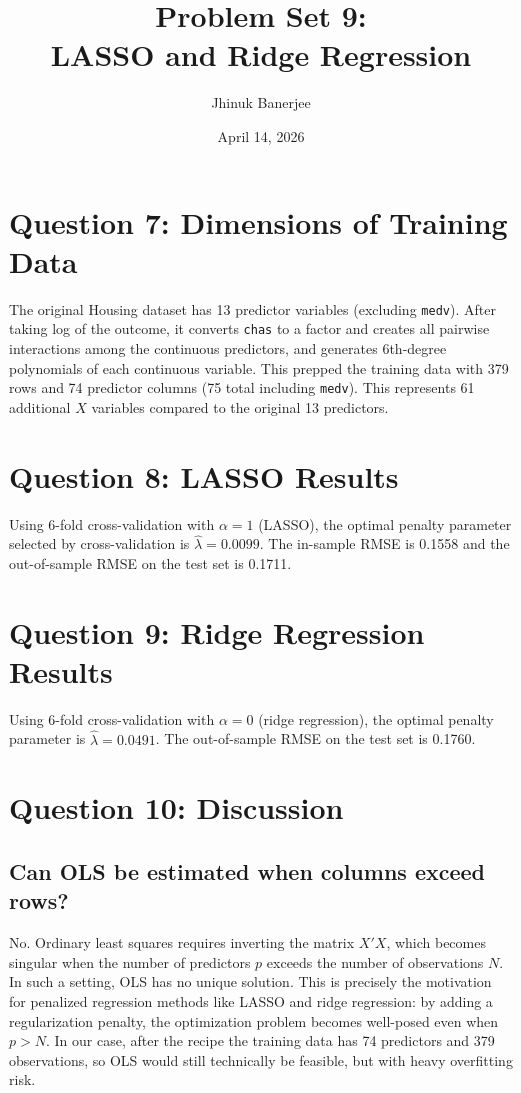 \documentclass[12pt]{article}
\title{\textbf{Problem Set 9:} \\
LASSO and Ridge Regression}
\author{Jhinuk Banerjee}
\date{April 14, 2026}
\begin{document}
\maketitle

\section*{Question 7: Dimensions of Training Data}

The original Housing dataset has 13 predictor variables (excluding \texttt{medv}).
After taking log of the outcome, it converts \texttt{chas} to a
factor and creates all pairwise interactions among the continuous predictors, and generates
6th-degree polynomials of each continuous variable. This prepped the training data with
379 rows and 74 predictor columns (75 total including \texttt{medv}).
This represents 61 additional $X$ variables compared to the original 13 predictors.

\section*{Question 8: LASSO Results}

Using 6-fold cross-validation with $\alpha = 1$ (LASSO), the optimal penalty
parameter selected by cross-validation is $\hat{\lambda} = 0.0099$.
The in-sample RMSE is 0.1558 and the out-of-sample RMSE on the test set
is 0.1711.

\section*{Question 9: Ridge Regression Results}

Using 6-fold cross-validation with $\alpha = 0$ (ridge regression), the optimal
penalty parameter is $\hat{\lambda} = 0.0491$.
The out-of-sample RMSE on the test set is 0.1760.

\section*{Question 10: Discussion}

\subsection*{Can OLS be estimated when columns exceed rows?}

No. Ordinary least squares requires inverting the matrix $X'X$, which becomes
singular when the number of predictors $p$ exceeds the number of observations $N$.
In such a setting, OLS has no unique solution. This is precisely the motivation
for penalized regression methods like LASSO and ridge regression: by adding a
regularization penalty, the optimization problem becomes well-posed even when
$p > N$. In our case, after the recipe the training data has 74 predictors and
379 observations, so OLS would still technically be feasible, but with heavy
overfitting risk.
\end{document}

